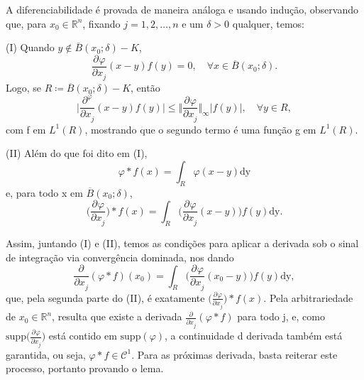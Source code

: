 \documentclass[../distribution_theory_notes.tex]{subfiles}
\begin{document}
\begin{proof*}
                        A diferenciabilidade é provada de maneira análoga e usando indução, observando que, para \(x_{0}\in \mathbb{R}^{n}\), fixando \(j=1,2,\dotsc ,n\) e um \(\delta >0\) qualquer, temos: 

                        (I) Quando \(y\not\in \overline{B}(x_{0}; \delta  )-K\), 
                          \[
                            \frac{\partial^{}\varphi }{\partial x_{j}^{}}(x-y)f(y)=0,\quad \forall x\in \overline{B}(x_{0}; \delta ).
                          \]
                          Logo, se \(R\coloneqq \overline{B}(x_{0}; \delta )-K\), então 
                            \[
                              \biggl\vert \frac{\partial^{\varphi }}{\partial x_{j}^{}}(x-y)f(y) \biggr\vert \leq \biggl\Vert \frac{\partial^{}\varphi }{\partial x_{j}^{}} \biggr\Vert_{\infty}|f(y)|,\quad \forall y\in R,
                            \]
                            com f em \(L^{1}(R)\), mostrando que o segundo termo é uma função g em \(L^{1}(R)\).

                            (II) Além do que foi dito em (I), 
                              \[
                                \varphi *f(x)=\int_{R}^{}\varphi (x-y) \mathrm{dy}
                              \]
                              e, para todo x em \(\overline{B}(x_{0}; \delta )\), 
                                \[
                                  \biggl(\frac{\partial^{}\varphi }{\partial x_{j}^{}}\biggr)* f(x) = \int_{R}^{}\biggl(\frac{\partial^{}\varphi }{\partial x_{j}^{}}(x-y)\biggr)f(y) \mathrm{dy}.
                                \]

                                Assim, juntando (I) e (II), temos as condições para aplicar a derivada sob o sinal de integração via convergência dominada, nos dando 
                                  \[
                                    \frac{\partial^{}}{\partial x_{j}^{}}(\varphi *f)(x_{0})=\int_{R}^{}\biggl(\frac{\partial^{}\varphi }{\partial x_{j}^{}}(x_{0}-y)\biggr)f(y) \mathrm{dy},
                                  \]
                                  que, pela segunda parte do (II), é exatamente \(\biggl(\frac{\partial^{}\varphi }{\partial x_{j}^{}}\biggr)* f(x)\). Pela arbitrariedade de \(x_{0}\in \mathbb{R}^{n}\), resulta que existe a derivada \(\frac{\partial^{}}{\partial x_{j}^{}}(\varphi *f)\) para todo j, e, como \(\mathrm{supp}\biggl(\frac{\partial^{}\varphi }{\partial x_{j}^{}}\biggr)\) está contido em \(\mathrm{supp}(\varphi )\), a continuidade d derivada também está garantida, ou seja, \(\varphi *f\in \mathcal{C}^{1}\). Para as próximas derivada, basta reiterar este processo, portanto provando o lema. \qedsymbol
                                    
\end{proof*}
\end{document}
